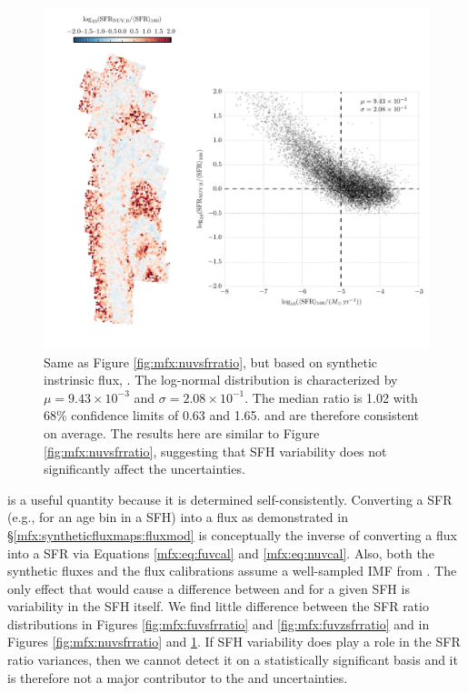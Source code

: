 \documentclass[iop, tighten]{emulateapj}
\begin{document}
\begin{figure}
\centering
\includegraphics[width=\textwidth]{m31flux-figures/sfr_nuv0-vs-mean.pdf}
\caption[Ratio of the \sfr{} based on the synthetic intrinsic \nuv{} flux to
the $100\myr$ mean \sfr{}.]{Same as Figure \ref{fig:mfx:nuvsfrratio}, but based
    on synthetic instrinsic flux, \sfrnuvz{}. The log-normal distribution is
    characterized by $\mu = 9.43\times 10^{-3}$ and $\sigma = 2.08\times
    10^{-1}$. The median ratio is 1.02 with 68\% confidence limits of 0.63 and
    1.65. \sfrnuvz{} and \sfroneh{} are therefore consistent on average. The
    results here are similar to Figure \ref{fig:mfx:nuvsfrratio}, suggesting
    that SFH variability does not significantly affect the \sfrnuv{}
    uncertainties.
}
\label{fig:mfx:nuvzsfrratio}
\end{figure}


\sfrxz{} is a useful quantity because it is determined self-consistently.
Converting a SFR (e.g., for an age bin in a SFH) into a flux as demonstrated in
\S \ref{mfx:syntheticfluxmaps:fluxmod} is conceptually the inverse of
converting a flux into a SFR via Equations \ref{mfx:eq:fuvcal} and
\ref{mfx:eq:nuvcal}. Also, both the synthetic fluxes and the flux calibrations
assume a well-sampled IMF from \citet{Kroupa:2001}. The only effect that would
cause a difference between \sfroneh{} and \sfrxz{} for a given SFH is
variability in the SFH itself. We find little difference between the SFR ratio
distributions in Figures \ref{fig:mfx:fuvsfrratio} and
\ref{fig:mfx:fuvzsfrratio} and in Figures \ref{fig:mfx:nuvsfrratio} and
\ref{fig:mfx:nuvzsfrratio}. If SFH variability does play a role in the SFR
ratio variances, then we cannot detect it on a statistically significant basis
and it is therefore not a major contributor to the \sfrx{} and \sfrxz{}
uncertainties.
\end{document}
